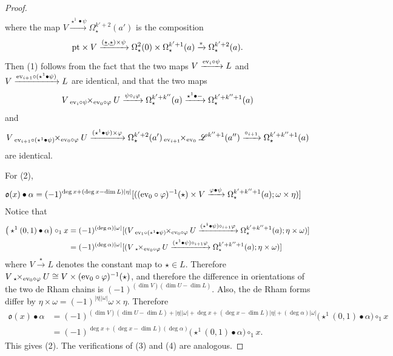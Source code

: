 \documentclass[10pt]{amsart}
\numberwithin{equation}{section}
\theoremstyle{plain}
\theoremstyle{definition}
\theoremstyle{remark}
\numberwithin{equation}{section}
\newcommand{\ev}{\textup{ev}}
\newcommand{\pt}{\textup{pt}}
\newcommand{\fiberprod}[2]{\,_{#1}\!\!\times_{#2} }
\begin{document}
{\begin{proof}
\begin{align*}
 \end{align*}
 where the map $V\xrightarrow{\star^1\bullet \psi} \Omega_\star^{k'+2}(a')$ is the composition 
 \begin{align*}
 	\pt\times V\xrightarrow{(\underline{\star},\underline{\star}) \times \psi} \Omega^2_\star(0)\times \Omega^{k'+1}_\star(a) \xrightarrow{ *} \Omega_\star^{k'+2}(a).
 \end{align*}
Then (1) follows from the fact that the two maps $V\xrightarrow{\ev_i\circ \psi} L$ and $V\xrightarrow{\ev_{i+1}\circ (\star^1\bullet \psi)}L$ are identical, and that the two maps \[ V\fiberprod{\ev_i\circ \psi}{\ev_0\circ\varphi} U \xrightarrow{\psi\circ_i\varphi} \Omega_\star^{k'+k''}(a) \xrightarrow{\star^1\bullet-} \Omega^{k'+k''+1}_\star(a) \]
	and 
	\[
		V\fiberprod{\ev_{i+1}\circ(\star^1\bullet \psi)}{\ev_0\circ \varphi}U \xrightarrow{(\star^1\bullet\psi)\times \varphi} \Omega_\star^{k'+2}(a')\fiberprod{\ev_{i+1}}{\ev_0} \mathscr{L}^{k''+1}(a'')  \xrightarrow{\circ_{i+1}} \Omega_\star^{k'+k''+1}(a)
	\]
	are identical.
	
	For (2), 
	\begin{align*}
		\mathfrak{o}(x) \bullet \alpha &= (-1)^{\deg x + (\deg x - \dim L)|\eta|}[((\ev_0\circ \varphi)^{-1}(\star) \times V \xrightarrow{ \varphi\bullet \psi} \Omega_\star^{k'+k''+1}(a);\omega\times \eta)]
	\end{align*}
	Notice that 
	\begin{align*}
		\big(\star^1(0,1)\bullet \alpha\big) \circ_{1} x &= (-1)^{(\deg\alpha)|\omega|}[ (V\fiberprod{ \ev_{1}\circ(\star^1\bullet \psi)}{\ev_0\circ \varphi}U \xrightarrow{(\star^1\bullet\psi) \circ_{i+1} \varphi} \Omega_\star^{k'+k''+1}(a); \eta\times \omega) ] \\
		&=(-1)^{(\deg \alpha)|\omega|}[(V\fiberprod{\star}{\ev_0\circ \varphi}U \xrightarrow{(\star^1\bullet \psi) \circ_{i+1} \varphi} \Omega_\star^{k'+k''+1}(a);\eta\times \omega)]
	\end{align*}
	where $V\xrightarrow{\star} L$ denotes the constant map to $\star \in L$. Therefore $V\fiberprod{\star}{\ev_0\circ \varphi}U \cong  V\times (\ev_0\circ \varphi)^{-1}(\star)$, and therefore the difference in orientations of the two de Rham chains is $(-1)^{(\dim V)(\dim U-\dim L)}$. Also, the de Rham forms differ by $\eta\times \omega = (-1)^{|\eta||\omega|}\omega\times \eta$. Therefore 
	\begin{align*}
		\mathfrak{o}(x) \bullet \alpha &= (-1)^{(\dim V)(\dim U - \dim L)+|\eta||\omega|+ \deg x+(\deg x-\dim L)|\eta|+(\deg \alpha) |\omega|} \big(\star^1(0,1)\bullet \alpha\big) \circ_{1} x \\
		&=(-1)^{\deg x + ( \deg x - \dim L)(\deg \alpha)}\big(\star^1(0,1)\bullet \alpha\big) \circ_{1} x.
	\end{align*}
	This gives (2). The verifications of (3) and (4) are analogous.
\end{proof}


}
\end{document}
